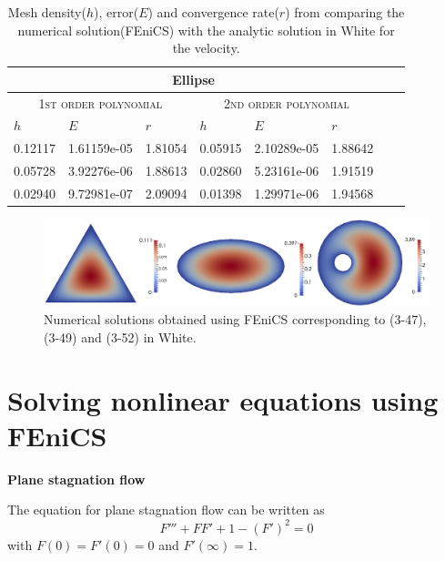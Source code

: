 \documentclass[11pt,a4paper,english]{article}
\numberwithin{equation}{section}
\begin{document}
\begin{table}[H]
\centering
\caption{Mesh density($h$), error($E$) and convergence rate($r$) from comparing the numerical solution(FEniCS) with the analytic solution in White for the velocity. }
\vspace{3mm}
\begin{tabular}{|l|l|l|l|l|l|l|l|}
\hline
 \multicolumn{6}{|c|}{\textbf{Ellipse}}   \\
\hline
 \multicolumn{3}{|c|}{ \textsc{1st order polynomial}} &  \multicolumn{3}{|c|}{\textsc{2nd order polynomial}}  \\
\hline
$h$ & $E$ & $r$ & $h$ & $E$ & $r$   \\
\hline
0.12117 & 1.61159e-05 & 1.81054 & 0.05915 & 2.10289e-05 & 1.88642 \\
0.05728 & 3.92276e-06 & 1.88613 & 0.02860 & 5.23161e-06 & 1.91519 \\
0.02940 & 9.72981e-07 & 2.09094 & 0.01398 & 1.29971e-06 & 1.94568 \\
\hline
\end{tabular}
\label{tab:time}
\end{table}


\vspace{1.5cm}
\begin{figure}[h!] 
\begin{center}
  \includegraphics[scale=0.18]{ducts.png}
  \end{center}
  \caption{Numerical solutions obtained using FEniCS corresponding to (3-47), (3-49) and (3-52) in White.}
\end{figure}

\section{Solving nonlinear equations using FEniCS}

\textbf{Plane stagnation flow}

The equation for plane stagnation flow can be written as
\begin{equation}
F''' + FF' + 1 - (F')^2 = 0
\end{equation}
with $F(0) = F'(0) = 0$ and $F'(\infty)=1$.
\end{document}
